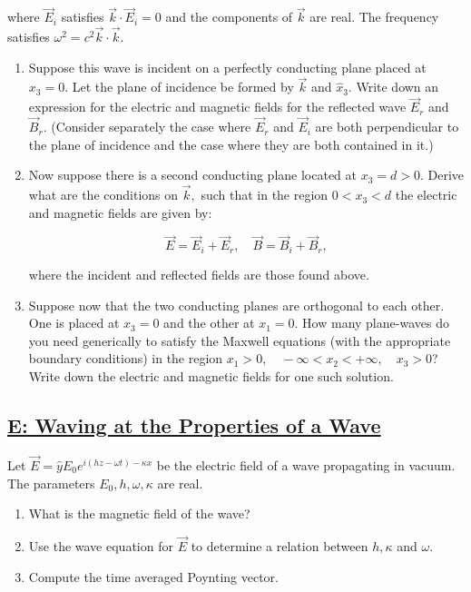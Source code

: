 where $\vec{E}_{i}$ satisfies $\vec{k} \cdot \vec{E}_{i}=0$ and the components of $\vec{k}$ are real. The frequency satisfies $\omega^{2}=c^{2} \vec{k} \cdot \vec{k}$.

\begin{enumerate}
	\item Suppose this wave is incident on a perfectly conducting plane placed at $x_{3}=0 .$ Let the plane of incidence be formed by $\vec{k}$ and $\hat{x}_{3} .$ Write down an expression for the electric and magnetic fields for the reflected wave $\vec{E}_{r}$ and $\vec{B}_{r} .$ (Consider separately the case where $\vec{E}_{r}$ and $\vec{E}_{i}$ are both perpendicular to the plane of incidence and the case where they are both contained in it.)
	\item Now suppose there is a second conducting plane located at $x_{3}=d>0$. Derive what are the conditions on $\vec{k},$ such that in the region $0<x_{3}<d$ the electric and magnetic fields are given by:
	
	\begin{equation}
		\vec{E}=\vec{E}_{i}+\vec{E}_{r}, \quad \vec{B}=\vec{B}_{i}+\vec{B}_{r},
	\end{equation}

	where the incident and reflected fields are those found above.
	\item Suppose now that the two conducting planes are orthogonal to each other. One is placed at $x_{3}=0$ and the other at $x_{1}=0 .$ How many plane-waves do you need generically to satisfy the Maxwell equations (with the appropriate boundary conditions) in the region $x_{1}>0, \quad-\infty<x_{2}<+\infty, \quad x_{3}>0 $? Write down the electric and magnetic fields for one such solution.
\end{enumerate}


\subsection{\hyperref[E: Waving at the Properties of a Wave]{E: Waving at the Properties of a Wave}}

Let $\vec{E}=\hat{y} E_{0} e^{i(h z-\omega t)-\kappa x}$ be the electric field of a wave propagating in vacuum. The parameters $E_{0}, h, \omega, \kappa$ are real.

\begin{enumerate}
	\item What is the magnetic field of the wave?
	\item Use the wave equation for $\vec{E}$ to determine a relation between $h, \kappa$ and $\omega$.
	\item Compute the time averaged Poynting vector.	
\end{enumerate}
